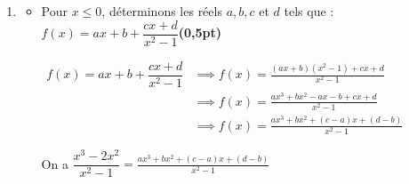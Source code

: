 \documentclass[12pt,a4paper]{article}
\begin{document}
\begin{enumerate}
\begin{enumerate}
\begin{itemize}
\begin{itemize}
    \begin{resultbox}
    \[
    \mathbf{\lim\limits_{x \to -1^{-}} f(x) =-\infty }
    \]
   \end{resultbox}

										\item \underline{En $-1^{+}$}: $f(x)=f_{1}(x)$

\(
\begin{aligned}
 \lim\limits_{x \to -1^{+}} f(x) &= \lim\limits_{x \to 1^{+}} \dfrac{x^3 - 2x^2}{x^2 - 1}\\
 																	&= \dfrac{-3}{0^{-}}\\
 																	&= +\infty
\end{aligned}    
\)

    \begin{resultbox}
    \[
    \mathbf{\lim\limits_{x \to -1^{+}} f(x) =+\infty }
    \]
   \end{resultbox}
   								\end{itemize}
\item Déduisons-en l'existence d'une asymptote dont on précisera.\textbf{(0,25pt)}

Comme $\lim\limits_{x \to -1} f(x) = \infty$ donc $x=-1$ est une asymptote verticale

    \begin{resultbox}
    \[
    \mathbf{ \text{Donc }   x = -1  \text{ est une asymptote verticale à } (\mathcal{C}_f) }
    \]
   \end{resultbox}

  \end{itemize}     
        \item 
        \begin{itemize}
        \item Pour $x \leq 0$, déterminons les réels $a, b, c$ et $d$ tels que : 
        $f(x)=ax+b+\dfrac{cx+d}{x^2-1}$\textbf{(0,5pt)}

 $
 \begin{aligned}  
 f(x)=ax+b+\dfrac{cx+d}{x^2-1} &\implies f(x)=\frac{(ax+b)(x^2-1)+cx+d}{x^2-1}\\
                               &\implies f(x)=\frac{ax^3+bx^2-ax-b+cx+d}{x^2-1}\\
                               &\implies f(x)=\frac{ax^3+bx^2+(c-a)x+(d-b)}{x^2-1}
 \end{aligned} 
 $   

On a $\dfrac{x^3 - 2x^2}{x^2 - 1}=\frac{ax^3+bx^2+(c-a)x+(d-b)}{x^2-1}$ 


\end{itemize}
\end{enumerate}
\end{enumerate}
\end{document}

